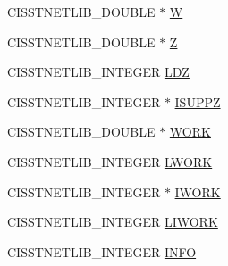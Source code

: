 \begin{DoxyCompactItemize}
\item 
C\-I\-S\-S\-T\-N\-E\-T\-L\-I\-B\-\_\-\-D\-O\-U\-B\-L\-E $\ast$ \hyperlink{classnmr_symmetric_eigen_problem_1_1_data_a5a226e24154e642e870208bdc3e95067}{W}
\item 
C\-I\-S\-S\-T\-N\-E\-T\-L\-I\-B\-\_\-\-D\-O\-U\-B\-L\-E $\ast$ \hyperlink{classnmr_symmetric_eigen_problem_1_1_data_a26f2388aec0bf6c027e7bcdd211212a2}{Z}
\item 
C\-I\-S\-S\-T\-N\-E\-T\-L\-I\-B\-\_\-\-I\-N\-T\-E\-G\-E\-R \hyperlink{classnmr_symmetric_eigen_problem_1_1_data_a674df370daf94527f6d3832756a3d26d}{L\-D\-Z}
\item 
C\-I\-S\-S\-T\-N\-E\-T\-L\-I\-B\-\_\-\-I\-N\-T\-E\-G\-E\-R $\ast$ \hyperlink{classnmr_symmetric_eigen_problem_1_1_data_a834fa5a5634ddd8d0446d08a2399ea1f}{I\-S\-U\-P\-P\-Z}
\item 
C\-I\-S\-S\-T\-N\-E\-T\-L\-I\-B\-\_\-\-D\-O\-U\-B\-L\-E $\ast$ \hyperlink{classnmr_symmetric_eigen_problem_1_1_data_ab0f6be9610721bccfc57ecb8a81d626d}{W\-O\-R\-K}
\item 
C\-I\-S\-S\-T\-N\-E\-T\-L\-I\-B\-\_\-\-I\-N\-T\-E\-G\-E\-R \hyperlink{classnmr_symmetric_eigen_problem_1_1_data_a26e4bcb86e78c1956cfbecce39e82336}{L\-W\-O\-R\-K}
\item 
C\-I\-S\-S\-T\-N\-E\-T\-L\-I\-B\-\_\-\-I\-N\-T\-E\-G\-E\-R $\ast$ \hyperlink{classnmr_symmetric_eigen_problem_1_1_data_a69207752243303be9decd75fec5202ed}{I\-W\-O\-R\-K}
\item 
C\-I\-S\-S\-T\-N\-E\-T\-L\-I\-B\-\_\-\-I\-N\-T\-E\-G\-E\-R \hyperlink{classnmr_symmetric_eigen_problem_1_1_data_a1d7b6a44980d5ad56ec33a71c8a95ae7}{L\-I\-W\-O\-R\-K}
\item 
C\-I\-S\-S\-T\-N\-E\-T\-L\-I\-B\-\_\-\-I\-N\-T\-E\-G\-E\-R \hyperlink{classnmr_symmetric_eigen_problem_1_1_data_ad55f6f2d8f8e82e7daebace30b285f88}{I\-N\-F\-O}
\end{DoxyCompactItemize}


